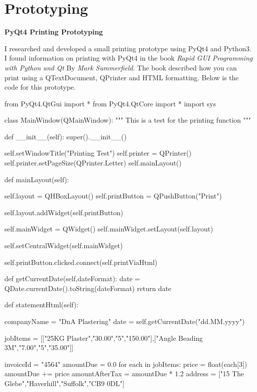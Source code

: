 \section{Prototyping}

\textbf{PyQt4 Printing Prototyping}
\begin{flushleft}
I researched and developed a small printing prototype using PyQt4 and Python3. I found information on printing with PyQt4 in the book \emph{Rapid GUI Programming with Python and Qt} By \emph{Mark Summerfield}. The book described how you can print using a QTextDocument, QPrinter and HTML formatting. Below is the code for this prototype.
\end{flushleft}
\begin{python}
from PyQt4.QtGui import *
from PyQt4.QtCore import *
import sys


class MainWindow(QMainWindow):
    """ This is a test for the printing function """

    def __init__(self):
        super().__init__()


        self.setWindowTitle("Printing Test")
        self.printer = QPrinter()
        self.printer.setPageSize(QPrinter.Letter)
        self.mainLayout()

        
    def mainLayout(self):

        self.layout = QHBoxLayout()
        self.printButton = QPushButton("Print")

        self.layout.addWidget(self.printButton)

        self.mainWidget = QWidget()
        self.mainWidget.setLayout(self.layout)

        self.setCentralWidget(self.mainWidget)

        self.printButton.clicked.connect(self.printViaHtml)

    def getCurrentDate(self,dateFormat):
        date = QDate.currentDate().toString(dateFormat)
        return date

    def statementHtml(self):

        companyName = "DnA Plastering"
        date = self.getCurrentDate("dd.MM.yyyy")

        jobItems = [["25KG Plaster","30.00","5","150.00"],["Angle Beading 3M","7.00","5","35.00"]]

        invoiceId = "4564"
        amountDue = 0.0
        for each in jobItems:
            price = float(each[3])
            amountDue += price
        amountAfterTax = amountDue * 1.2
        address = ["15 The Glebe","Haverhill","Suffolk","CB9 0DL"]
        

\end{python}
